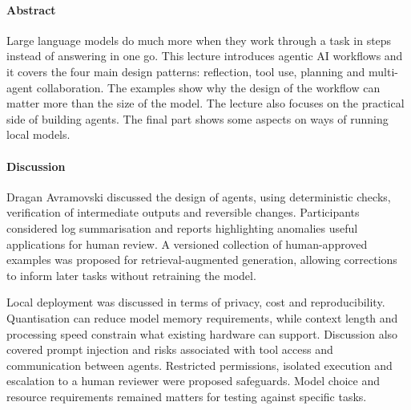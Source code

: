 \paragraph{Abstract}
Large language models do much more when they work through a task in steps instead of answering in one go. This lecture introduces agentic AI workflows and it covers the four main design patterns: reflection, tool use, planning and multi-agent collaboration. The examples show why the design of the workflow can matter more than the size of the model. The lecture also focuses on the practical side of building agents. The final part shows some aspects on ways of running local models.
\mbox{}\par

\paragraph{Discussion}
Dragan Avramovski discussed the design of agents, using deterministic checks, verification of intermediate outputs and reversible changes. Participants considered log summarisation and reports highlighting anomalies useful applications for human review. A versioned collection of human-approved examples was proposed for retrieval-augmented generation, allowing corrections to inform later tasks without retraining the model.

Local deployment was discussed in terms of privacy, cost and reproducibility. Quantisation can reduce model memory requirements, while context length and processing speed constrain what existing hardware can support. Discussion also covered prompt injection and risks associated with tool access and communication between agents. Restricted permissions, isolated execution and escalation to a human reviewer were proposed safeguards. Model choice and resource requirements remained matters for testing against specific tasks.

